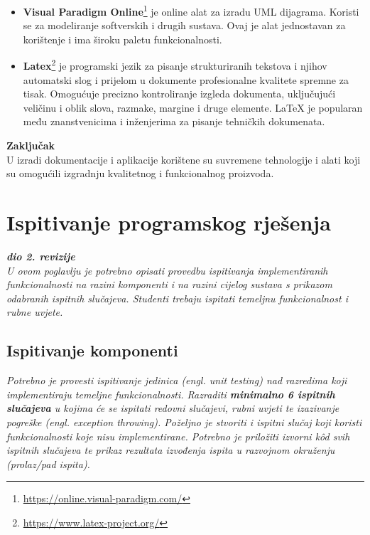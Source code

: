 \begin{itemize}
			\item\textbf{Visual Paradigm Online}\footnote{\url{https://online.visual-paradigm.com/}} je online alat za izradu UML dijagrama. Koristi se za modeliranje softverskih i drugih sustava. Ovaj je alat jednostavan za korištenje i ima široku paletu funkcionalnosti. 
			
			\item\textbf{Latex}\footnote{\url{https://www.latex-project.org/}} je programski jezik za pisanje strukturiranih tekstova i njihov automatski slog i prijelom u dokumente profesionalne kvalitete spremne za tisak. Omogućuje precizno kontroliranje izgleda dokumenta, uključujući veličinu i oblik slova, razmake, margine i druge elemente. LaTeX je popularan među znanstvenicima i inženjerima za pisanje tehničkih dokumenata.
			\end{itemize}
			
			\textbf{Zaključak}\\
			U izradi dokumentacije i aplikacije korištene su suvremene tehnologije i alati koji su omogućili izgradnju kvalitetnog i funkcionalnog proizvoda.
			
			
		
	
		\section{Ispitivanje programskog rješenja}
			
			\textbf{\textit{dio 2. revizije}}\\
			
			 \textit{U ovom poglavlju je potrebno opisati provedbu ispitivanja implementiranih funkcionalnosti na razini komponenti i na razini cijelog sustava s prikazom odabranih ispitnih slučajeva. Studenti trebaju ispitati temeljnu funkcionalnost i rubne uvjete.}
	
			
			\subsection{Ispitivanje komponenti}
			\textit{Potrebno je provesti ispitivanje jedinica (engl. unit testing) nad razredima koji implementiraju temeljne funkcionalnosti. Razraditi \textbf{minimalno 6 ispitnih slučajeva} u kojima će se ispitati redovni slučajevi, rubni uvjeti te izazivanje pogreške (engl. exception throwing). Poželjno je stvoriti i ispitni slučaj koji koristi funkcionalnosti koje nisu implementirane. Potrebno je priložiti izvorni kôd svih ispitnih slučajeva te prikaz rezultata izvođenja ispita u razvojnom okruženju (prolaz/pad ispita). }
			
